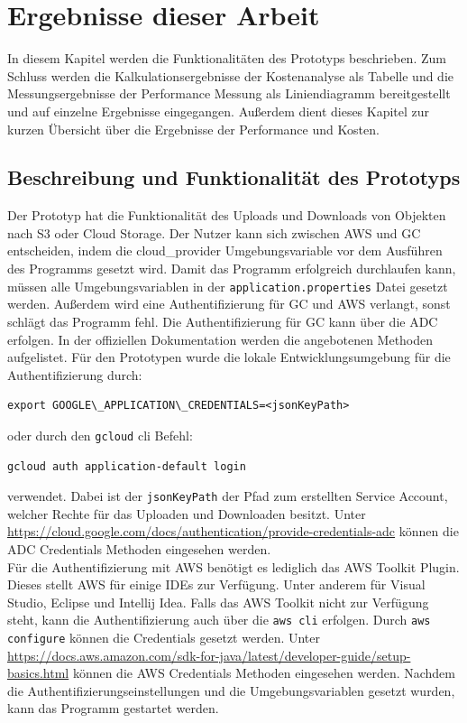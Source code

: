 \chapter{Ergebnisse dieser Arbeit}

In diesem Kapitel werden die Funktionalitäten des Prototyps beschrieben. Zum Schluss werden die Kalkulationsergebnisse der Kostenanalyse als Tabelle und die Messungsergebnisse der Performance Messung als Liniendiagramm bereitgestellt und auf einzelne Ergebnisse eingegangen. Außerdem dient dieses Kapitel zur kurzen Übersicht über die Ergebnisse der Performance und Kosten. 

\section{Beschreibung und Funktionalität des Prototyps}

Der Prototyp hat die Funktionalität des Uploads und Downloads von Objekten nach S3 oder Cloud Storage. Der Nutzer kann sich zwischen AWS und GC entscheiden, indem die cloud\_provider Umgebungsvariable vor dem Ausführen des Programms gesetzt wird. Damit das Programm erfolgreich durchlaufen kann, müssen alle Umgebungsvariablen in der \verb|application.properties| Datei gesetzt werden. Außerdem wird eine Authentifizierung für GC und AWS verlangt, sonst schlägt das Programm fehl. Die Authentifizierung für GC kann über die ADC erfolgen. In der offiziellen Dokumentation werden die angebotenen Methoden aufgelistet. Für den Prototypen wurde die lokale Entwicklungsumgebung für die Authentifizierung durch: 

\begin{lstlisting}
export GOOGLE\_APPLICATION\_CREDENTIALS=<jsonKeyPath>
\end{lstlisting}
	
	oder durch den \verb|gcloud| cli Befehl: 
	
\begin{lstlisting}
gcloud auth application-default login
\end{lstlisting}
	
	verwendet. Dabei ist der \verb|jsonKeyPath| der Pfad zum erstellten Service Account, welcher Rechte für das Uploaden und Downloaden besitzt. Unter \url{https://cloud.google.com/docs/authentication/provide-credentials-adc} können die ADC Credentials Methoden eingesehen werden.\\
	
Für die Authentifizierung mit AWS benötigt es lediglich das AWS Toolkit Plugin. Dieses stellt AWS für einige IDEs zur Verfügung. Unter anderem für Visual Studio, Eclipse und Intellij Idea. Falls das AWS Toolkit nicht zur Verfügung steht, kann die Authentifizierung auch über die \verb|aws cli| erfolgen. Durch \verb|aws configure| können die Credentials gesetzt werden. Unter \url{https://docs.aws.amazon.com/sdk-for-java/latest/developer-guide/setup-basics.html} können die AWS Credentials Methoden eingesehen werden. Nachdem die Authentifizierungseinstellungen und die Umgebungsvariablen gesetzt wurden, kann das Programm gestartet werden.\\


